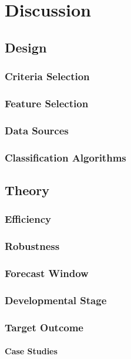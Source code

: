 ﻿\documentclass[../thesis/thesis.tex]{subfiles}
\begin{document}
\chapter{Discussion}
\label{chap:discussion}

\section{Design}

\subsection{Criteria Selection}
\subsection{Feature Selection}
\subsection{Data Sources}
\subsection{Classification Algorithms}

\section{Theory}

\subsection{Efficiency}
\subsection{Robustness}
\subsection{Forecast Window}
\subsection{Developmental Stage}
\subsection{Target Outcome}

\subsubsection{Case Studies}
\end{document}
